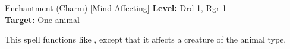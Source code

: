 {Enchantment (Charm) [Mind-Affecting]}
{
	\textbf{Level:}
	Drd 1, Rgr 1\\
	\textbf{Target:}
	One animal\\
}
{
	This spell functions like , except that it affects a creature of the animal type.

}
